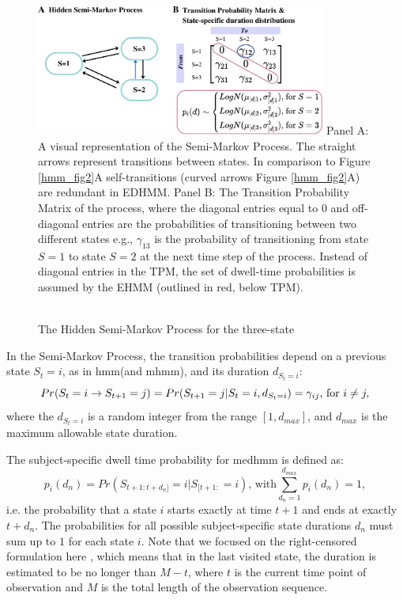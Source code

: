 \begin{figure}
\centering
\caption{\\The Hidden Semi-Markov Process for the three-state }
\includegraphics[width=0.85\textwidth]{graphics/time_edhmm_s2.pdf}
\flushleft
\footnotesize
\justifying
Panel A: A visual representation of the Semi-Markov Process. The straight arrows represent transitions between states. In comparison to Figure \ref{hmm_fig2}A self-transitions (curved arrows Figure \ref{hmm_fig2}A) are redundant in EDHMM. Panel B: The Transition Probability Matrix of the process, where the diagonal entries equal to $0$ and off-diagonal entries are the probabilities of transitioning between two different states e.g., $\gamma_{13}$ is the probability of transitioning from state $S=1$ to state $S=2$ at the next time step of the process. Instead of diagonal entries in the TPM, the set of dwell-time probabilities is assumed by the EHMM (outlined in red, below TPM).
 \label{edhmm_fig2}
\end{figure}
\newpage
In the Semi-Markov Process, the transition probabilities depend on a previous state ${S_{t}=i}$, as in \ac{hmm}(and \ac{mhmm}), and its duration $d_{S_{t}=i}$:
\begin{equation}
 Pr(S_t=i \rightarrow S_{t+1}=j)=Pr(S_{t+1}=j|S_{t}=i,d_{S_{t}=i})=\gamma_{ij} \\\text{, for } i\neq j,
\end{equation}
where the $d_{S_{t}=i}$ is a random integer from the range ${\left [ 1, d_{max} \right ]}$, and $d_{max}$ is the maximum allowable state duration.

The subject-specific dwell time probability for \ac{medhmm} is defined as:
\begin{equation}
\label{eq5}
 p_{i}(d_n)=Pr(S_{t+1:t+d_n]}=i|S_{[t+1:}=i)\text{, with} \sum^{d_{max}}_{d_n=1}p_{i}(d_n)=1,
\end{equation}
i.e. the probability that a state $i$ starts exactly at time ${t + 1}$ and ends at exactly ${t + d_n}$. The probabilities for all possible subject-specific state durations $d_n$ must sum up to $1$ for each state $i$. Note that we focused on the right-censored formulation here \citep{Guédon_2007}, which means that in the last visited state, the duration is estimated to be no longer than $M-t$, where $t$ is the current time point of observation and $M$ is the total length of the observation sequence.

